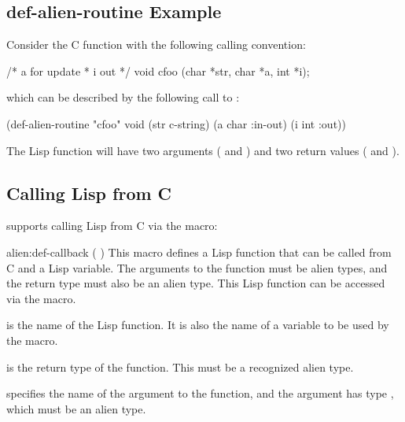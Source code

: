 \subsection{def-alien-routine Example}

Consider the C function  with the following calling convention:

\begin{example}
/* a for update
 * i out
 */
void cfoo (char *str, char *a, int *i);
\end{example}

which can be described by the following call to :

\begin{lisp}
(def-alien-routine "cfoo" void
  (str c-string)
  (a char :in-out)
  (i int :out))
\end{lisp}

The Lisp function  will have two arguments ( and )
and two return values ( and ).


\subsection{Calling Lisp from C}



\cmucl{} supports calling Lisp from C via the 
macro:

\begin{defmac}{alien:}{def-callback}{ (
    )}
  This macro defines a Lisp function that can be called from C and a
  Lisp variable.  The arguments to the function must be alien types,
  and the return type must also be an alien type.  This Lisp function
  can be accessed via the  macro.

   is the name of the Lisp function.  It is also the name of
  a variable to be used by the  macro.

   is the return type of the function.  This must be
  a recognized alien type.

   specifies the name of the argument to the function,
  and the argument has type , which must be an alien type.
\end{defmac}

